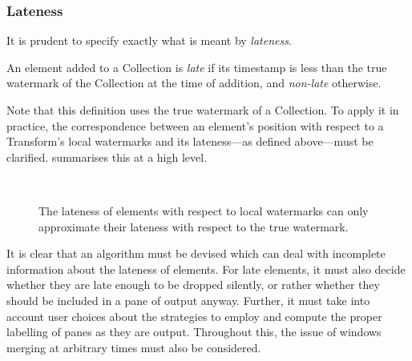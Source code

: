 \subsubsection{Lateness}

It is prudent to specify exactly what is meant by \emph{lateness}.

An element added to a Collection is \emph{late} if its timestamp is less than the true watermark of the Collection at the time of addition, and \emph{non-late} otherwise.

Note that this definition uses the true watermark of a Collection.
To apply it in practice, the correspondence between an element's position with respect to a Transform's local watermarks and its lateness---as defined above---must be clarified.
 summarises this at a high level.

\begin{figure}[t]
	\\
	\caption{The lateness of elements with respect to local watermarks can only approximate their lateness with respect to the true watermark.}
	\label{fig:impl:lateness-knowability}
\end{figure}

It is clear that an algorithm must be devised which can deal with incomplete information about the lateness of elements.
For late elements, it must also decide whether they are late enough to be dropped silently, or rather whether they should be included in a pane of output anyway.
Further, it must take into account user choices about the strategies to employ and compute the proper labelling of panes as they are output.
Throughout this, the issue of windows merging at arbitrary times must also be considered.

